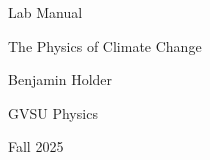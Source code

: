 \documentclass[letter,12pt]{book}
\begin{document}
\begin{titlepage}
    \centering
    \vspace*{\fill}
    {\Huge Lab Manual\par}
    {\Large The Physics of Climate Change\par}
    \vspace{1in}
    {\large Benjamin Holder\par}
    {\large GVSU Physics\par}
    Fall 2025
    \vspace*{\fill}
\end{titlepage}


\tableofcontents







\end{document}
